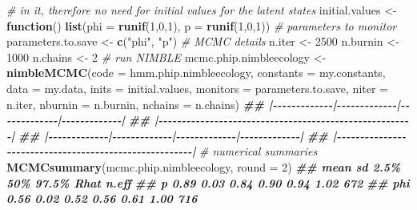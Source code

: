 \documentclass[
  12pt,
]{krantz}
\newenvironment{Shaded}{\begin{snugshade}}{\end{snugshade}}
\newcommand{\AttributeTok}[1]{\textcolor[rgb]{0.13,0.29,0.53}{#1}}
\newcommand{\CommentTok}[1]{\textcolor[rgb]{0.56,0.35,0.01}{\textit{#1}}}
\newcommand{\ControlFlowTok}[1]{\textcolor[rgb]{0.13,0.29,0.53}{\textbf{#1}}}
\newcommand{\DecValTok}[1]{\textcolor[rgb]{0.00,0.00,0.81}{#1}}
\newcommand{\DocumentationTok}[1]{\textcolor[rgb]{0.56,0.35,0.01}{\textbf{\textit{#1}}}}
\newcommand{\FunctionTok}[1]{\textcolor[rgb]{0.13,0.29,0.53}{\textbf{#1}}}
\newcommand{\NormalTok}[1]{#1}
\newcommand{\OtherTok}[1]{\textcolor[rgb]{0.56,0.35,0.01}{#1}}
\newcommand{\StringTok}[1]{\textcolor[rgb]{0.31,0.60,0.02}{#1}}
\begin{document}
\begin{Shaded}
\begin{Highlighting}[]
\CommentTok{\# in it, therefore no need for initial values for the latent states}
\NormalTok{initial.values }\OtherTok{\textless{}{-}} \ControlFlowTok{function}\NormalTok{() }\FunctionTok{list}\NormalTok{(}\AttributeTok{phi =} \FunctionTok{runif}\NormalTok{(}\DecValTok{1}\NormalTok{,}\DecValTok{0}\NormalTok{,}\DecValTok{1}\NormalTok{),}
                                  \AttributeTok{p =} \FunctionTok{runif}\NormalTok{(}\DecValTok{1}\NormalTok{,}\DecValTok{0}\NormalTok{,}\DecValTok{1}\NormalTok{))}
\CommentTok{\# parameters to monitor}
\NormalTok{parameters.to.save }\OtherTok{\textless{}{-}} \FunctionTok{c}\NormalTok{(}\StringTok{"phi"}\NormalTok{, }\StringTok{"p"}\NormalTok{)}
\CommentTok{\# MCMC details}
\NormalTok{n.iter }\OtherTok{\textless{}{-}} \DecValTok{2500}
\NormalTok{n.burnin }\OtherTok{\textless{}{-}} \DecValTok{1000}
\NormalTok{n.chains }\OtherTok{\textless{}{-}} \DecValTok{2}
\CommentTok{\# run NIMBLE}
\NormalTok{mcmc.phip.nimbleecology }\OtherTok{\textless{}{-}} \FunctionTok{nimbleMCMC}\NormalTok{(}\AttributeTok{code =}\NormalTok{ hmm.phip.nimbleecology, }
                        \AttributeTok{constants =}\NormalTok{ my.constants,}
                        \AttributeTok{data =}\NormalTok{ my.data,              }
                        \AttributeTok{inits =}\NormalTok{ initial.values,}
                        \AttributeTok{monitors =}\NormalTok{ parameters.to.save,}
                        \AttributeTok{niter =}\NormalTok{ n.iter,}
                        \AttributeTok{nburnin =}\NormalTok{ n.burnin, }
                        \AttributeTok{nchains =}\NormalTok{ n.chains)}
\DocumentationTok{\#\# |{-}{-}{-}{-}{-}{-}{-}{-}{-}{-}{-}{-}{-}|{-}{-}{-}{-}{-}{-}{-}{-}{-}{-}{-}{-}{-}|{-}{-}{-}{-}{-}{-}{-}{-}{-}{-}{-}{-}{-}|{-}{-}{-}{-}{-}{-}{-}{-}{-}{-}{-}{-}{-}|}
\DocumentationTok{\#\# |{-}{-}{-}{-}{-}{-}{-}{-}{-}{-}{-}{-}{-}{-}{-}{-}{-}{-}{-}{-}{-}{-}{-}{-}{-}{-}{-}{-}{-}{-}{-}{-}{-}{-}{-}{-}{-}{-}{-}{-}{-}{-}{-}{-}{-}{-}{-}{-}{-}{-}{-}{-}{-}{-}{-}|}
\DocumentationTok{\#\# |{-}{-}{-}{-}{-}{-}{-}{-}{-}{-}{-}{-}{-}|{-}{-}{-}{-}{-}{-}{-}{-}{-}{-}{-}{-}{-}|{-}{-}{-}{-}{-}{-}{-}{-}{-}{-}{-}{-}{-}|{-}{-}{-}{-}{-}{-}{-}{-}{-}{-}{-}{-}{-}|}
\DocumentationTok{\#\# |{-}{-}{-}{-}{-}{-}{-}{-}{-}{-}{-}{-}{-}{-}{-}{-}{-}{-}{-}{-}{-}{-}{-}{-}{-}{-}{-}{-}{-}{-}{-}{-}{-}{-}{-}{-}{-}{-}{-}{-}{-}{-}{-}{-}{-}{-}{-}{-}{-}{-}{-}{-}{-}{-}{-}|}
\CommentTok{\# numerical summaries}
\FunctionTok{MCMCsummary}\NormalTok{(mcmc.phip.nimbleecology, }\AttributeTok{round =} \DecValTok{2}\NormalTok{)}
\DocumentationTok{\#\#     mean   sd 2.5\%  50\% 97.5\% Rhat n.eff}
\DocumentationTok{\#\# p   0.89 0.03 0.84 0.90  0.94 1.02   672}
\DocumentationTok{\#\# phi 0.56 0.02 0.52 0.56  0.61 1.00   716}
\end{Highlighting}
\end{Shaded}
\end{document}
